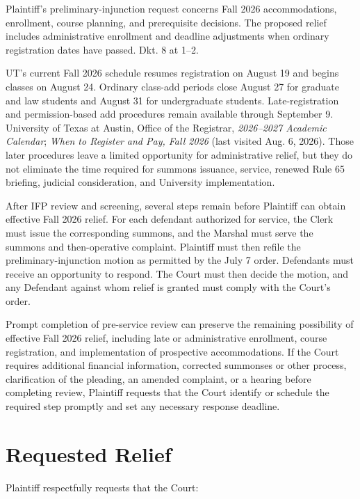 \documentclass[12pt]{article}
\begin{document}
Plaintiff's preliminary-injunction request concerns Fall 2026 accommodations, enrollment, course planning, and prerequisite decisions. The proposed relief includes administrative enrollment and deadline adjustments when ordinary registration dates have passed. Dkt. 8 at 1--2.

UT's current Fall 2026 schedule resumes registration on August 19 and begins classes on August 24. Ordinary class-add periods close August 27 for graduate and law students and August 31 for undergraduate students. Late-registration and permission-based add procedures remain available through September 9. University of Texas at Austin, Office of the Registrar, \textit{2026--2027 Academic Calendar}; \textit{When to Register and Pay, Fall 2026} (last visited Aug. 6, 2026). Those later procedures leave a limited opportunity for administrative relief, but they do not eliminate the time required for summons issuance, service, renewed Rule 65 briefing, judicial consideration, and University implementation.

After IFP review and screening, several steps remain before Plaintiff can obtain effective Fall 2026 relief. For each defendant authorized for service, the Clerk must issue the corresponding summons, and the Marshal must serve the summons and then-operative complaint. Plaintiff must then refile the preliminary-injunction motion as permitted by the July 7 order. Defendants must receive an opportunity to respond. The Court must then decide the motion, and any Defendant against whom relief is granted must comply with the Court's order.

Prompt completion of pre-service review can preserve the remaining possibility of effective Fall 2026 relief, including late or administrative enrollment, course registration, and implementation of prospective accommodations. If the Court requires additional financial information, corrected summonses or other process, clarification of the pleading, an amended complaint, or a hearing before completing review, Plaintiff requests that the Court identify or schedule the required step promptly and set any necessary response deadline.

\section*{Requested Relief}

Plaintiff respectfully requests that the Court:
\end{document}
